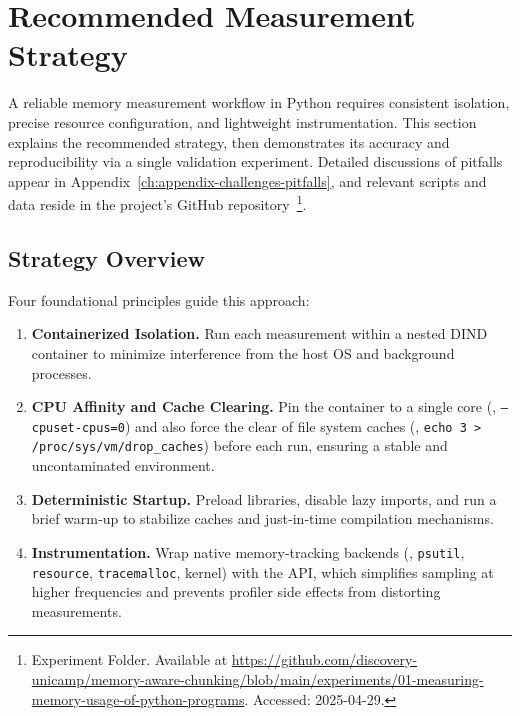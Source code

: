 \section{Recommended Measurement Strategy}
\label{sec:mmc-recommended-strategy}

A reliable memory measurement workflow in Python requires consistent isolation, precise resource configuration, and lightweight instrumentation.
This section explains the recommended strategy, then demonstrates its accuracy and reproducibility via a single validation experiment.
Detailed discussions of pitfalls appear in Appendix~\ref{ch:appendix-challenges-pitfalls}, and relevant scripts and data reside in the project's GitHub repository~\footnote{Experiment Folder. Available at \url{https://github.com/discovery-unicamp/memory-aware-chunking/blob/main/experiments/01-measuring-memory-usage-of-python-programs}. Accessed: 2025-04-29.}.

\subsection{Strategy Overview}
\label{subsec:strategy-overview}

Four foundational principles guide this approach:

\begin{enumerate}

    \item \textbf{Containerized Isolation.} Run each measurement within a nested \ac{DIND} container to minimize interference from the host \ac{OS} and background processes.

    \item \textbf{\ac{CPU} Affinity and Cache Clearing.} Pin the container to a single core (\eg, \texttt{--cpuset-cpus=0}) and also force the clear of file system caches (\eg, \texttt{echo 3 > /proc/sys/vm/drop\_caches}) before each run, ensuring a stable and uncontaminated environment.

    \item \textbf{Deterministic Startup.} Preload libraries, disable lazy imports, and run a brief warm‑up to stabilize caches and just‑in‑time compilation mechanisms.

    \item \textbf{\traceq Instrumentation.} Wrap native memory‑tracking backends (\eg, \texttt{psutil}, \texttt{resource}, \texttt{tracemalloc}, kernel) with the \traceq \ac{API}, which simplifies sampling at higher frequencies and prevents profiler side effects from distorting measurements.

\end{enumerate}

